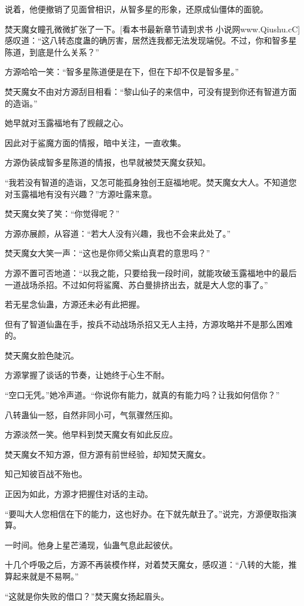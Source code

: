 \begin{this_body}
说着，他便撤销了见面曾相识，从智多星的形象，还原成仙僵体的面貌。

焚天魔女瞳孔微微扩张了一下。[看本书最新章节请到求书 小说网www.Qiushu.cC]感叹道：“这八转态度蛊的确厉害，居然连我都无法发现端倪。不过，你和智多星陈道，到底是什么关系？”

方源哈哈一笑：“智多星陈道便是在下，但在下却不仅是智多星。”

焚天魔女不由对方源刮目相看：“黎山仙子的来信中，可没有提到你还有智道方面的造诣。”

她早就对玉露福地有了觊觎之心。

因此对于鲨魔方面的情报，暗中关注，一直收集。

方源伪装成智多星陈道的情报，也早就被焚天魔女获知。

“我若没有智道的造诣，又怎可能孤身独创王庭福地呢。焚天魔女大人。不知道您对玉露福地有没有兴趣？”方源吐露来意。

焚天魔女笑了笑：“你觉得呢？”

方源亦展颜，从容道：“若大人没有兴趣，我也不会来此处了。”

焚天魔女大笑一声：“这也是你师父紫山真君的意思吗？”

方源不置可否地道：“以我之能，只要给我一段时间，就能攻破玉露福地中的最后一道战场杀招。不过如何将鲨魔、苏白曼排挤出去，就是大人您的事了。”

若无星念仙蛊，方源还未必有此把握。

但有了智道仙蛊在手，按兵不动战场杀招又无人主持，方源攻略并不是那么困难的。

焚天魔女脸色陡沉。

方源掌握了谈话的节奏，让她终于心生不耐。

“空口无凭。”她冷声道。“你说你有能力，就真的有能力吗？让我如何信你？”

八转蛊仙一怒，自然非同小可，气氛骤然压抑。

方源淡然一笑。他早料到焚天魔女有如此反应。

焚天魔女不知方源，但方源有前世经验，却知焚天魔女。

知己知彼百战不殆也。

正因为如此，方源才把握住对话的主动。

“要叫大人您相信在下的能力，这也好办。在下就先献丑了。”说完，方源便取指演算。

一时间。他身上星芒涌现，仙蛊气息此起彼伏。

十几个呼吸之后，方源不再装模作样，对着焚天魔女，感叹道：“八转的大能，推算起来就是不易啊。”

“这就是你失败的借口？”焚天魔女扬起眉头。


\end{this_body}
